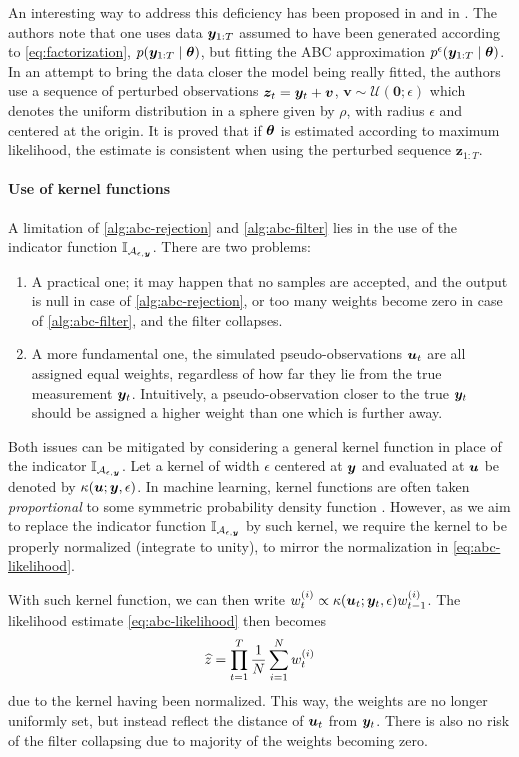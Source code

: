 An interesting way to address this deficiency has been proposed in \cite{noisy-abc1} and in \cite{noisy-abc2}. The authors note that one uses data $\bm{y}_{1:T}$ assumed to have been generated according to \eqref{eq:factorization}, $p(\bm{y}_{1:T} \mid \bm{\theta})$, but fitting the ABC approximation $p^\epsilon(\bm{y}_{1:T} \mid \bm{\theta})$. In an attempt to bring the data closer the model being really fitted, the authors use a sequence of perturbed observations $\bm{z}_t = \bm{y}_t + \bm{v}$, $\bm{v} \sim \mathcal{U}(\bm{0}; \epsilon)$ which denotes the uniform distribution in a sphere given by $\rho$, with radius $\epsilon$ and centered at the origin. It is proved that if $\bm{\theta}$ is estimated according to maximum likelihood, the estimate is consistent when using the perturbed sequence $\bm{z}_{1:T}$.


\paragraph{Use of kernel functions}
A limitation of \autoref{alg:abc-rejection} and \autoref{alg:abc-filter} lies in the use of the indicator function $\mathbb{I}_{\mathcal{A}_{\epsilon, \bm{y}}}$. There are two problems:
\begin{enumerate}
    \item A practical one; it may happen that no samples are accepted, and the output is null in case of \autoref{alg:abc-rejection}, or too many weights become zero in case of \autoref{alg:abc-filter}, and the filter collapses.
    \item A more fundamental one, the simulated pseudo-observations $\bm{u}_t$ are all assigned equal weights, regardless of how far they lie from the true measurement $\bm{y}_t$. Intuitively, a pseudo-observation closer to the true $\bm{y}_t$ should be assigned a higher weight than one which is further away.
\end{enumerate}
Both issues can be mitigated by considering a general kernel function in place of the indicator $\mathbb{I}_{\mathcal{A}_{\epsilon, \bm{y}}}$. Let a kernel of width $\epsilon$ centered at $\bm{y}$ and evaluated at $\bm{u}$ be denoted by $\kappa(\bm{u}; \bm{y}, \epsilon)$. In machine learning, kernel functions are often taken \emph{proportional} to some symmetric probability density function \citep{elements}. However, as we aim to replace the indicator function $\mathbb{I}_{\mathcal{A}_{\epsilon, \bm{y}}}$ by such kernel, we require the kernel to be properly normalized (integrate to unity), to mirror the normalization in \eqref{eq:abc-likelihood}.

With such kernel function, we can then write $w_t^{(i)} \propto \kappa(\bm{u}_t; \bm{y}_t, \epsilon) w_{t-1}^{(i)}$. The likelihood estimate \eqref{eq:abc-likelihood} then becomes
\begin{equation} \label{eq:abc-likelihood-kernel}
\widehat{z} = \prod_{t=1}^T \frac{1}{N} \sum_{i=1}^N w_t^{(i)}
\end{equation}
due to the kernel having been normalized. This way, the weights are no longer uniformly set, but instead reflect the distance of $\bm{u}_t$ from $\bm{y}_t$. There is also no risk of the filter collapsing due to majority of the weights becoming zero.

